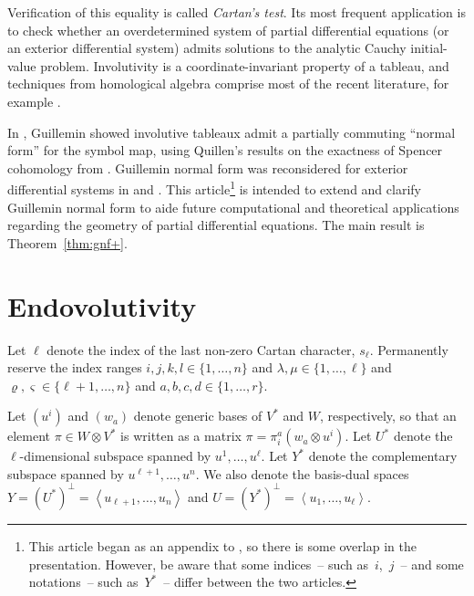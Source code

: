 \documentclass[11pt]{article}
\numberwithin{equation}{section}
\newcommand{\pair}[1]{\ensuremath{\left\langle #1 \right\rangle}}
\begin{document}
Verif\/ication of this equality is called \textit{Cartan's test}. Its most
frequent application is to check whether an overdetermined system of partial
dif\/ferential equations (or an exterior dif\/ferential system) admits solutions to
the analytic Cauchy initial-value problem. Involutivity is a coor\-di\-na\-te-invariant property of a tableau,
and techniques from homological algebra comprise most of the
recent literature, for example \cite{CGG2009, Kruglikov2007, Malgrange2003}.

In \cite{Guillemin1968}, Guillemin showed involutive tableaux admit
a partially commuting ``normal form'' for the symbol map, using Quillen's results on the
exactness of Spencer cohomology from \cite{Quillen1964}.  Guillemin normal form
was reconsidered for exterior dif\/ferential systems in \cite{Yang1987} and
\cite{BCGGG}.  This
article\footnote{This article began as an appendix to \cite{Smith2014b}, so there is some overlap in the presentation.
However, be aware that some indices~-- such as~$i$,~$j$~-- and some notations~-- such
as~$Y^*$~-- dif\/fer between the two articles.}
is intended to extend and clarify Guillemin normal form
to aide future computational and theoretical applications regarding the
geometry of partial
dif\/ferential equations.  The main result is Theorem~\ref{thm:gnf+}.

\section{Endovolutivity}
\label{sec:notation}
Let $\ell$ denote the index of the last non-zero Cartan character, $s_\ell$.
Permanently reserve the index ranges
$i,j,k,l \in \{ 1, \ldots, n\}$ and
$\lambda,\mu \in \{ 1, \ldots, \ell\}$ and
$\varrho, \varsigma \in \{ \ell+1, \ldots, n\}$ and
$a,b,c,d \in \{1, \ldots, r\}$.

Let $(u^i)$ and $(w_a)$ denote generic bases of $V^*$ and $W$, respectively, so that an
element $\pi \in W \otimes V^*$ is written as a matrix $\pi = \pi^a_i
(w_a \otimes u^i)$.
Let $U^*$ denote the $\ell$-dimensional subspace spanned by $u^1, \ldots,
u^\ell$. Let $Y^*$ denote the complementary subspace spanned by $u^{\ell+1},
\ldots, u^n$.
We also denote the basis-dual spaces $Y=(U^*)^\perp=\pair{u_{\ell+1},\ldots,u_n}$ and $U = (Y^*)^\perp = \pair{u_1,
\ldots, u_\ell}$.
\end{document}
